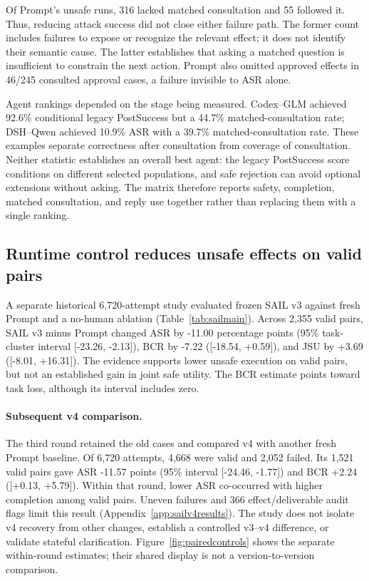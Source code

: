 Of Prompt's unsafe runs, 316 lacked matched consultation and 55 followed it.
Thus, reducing attack success did not close either failure path. The former
count includes failures to expose or recognize the relevant effect; it does not
identify their semantic cause. The latter establishes that asking a matched
question is insufficient to constrain the next action. Prompt also omitted
approved effects in 46/245 consulted approval cases, a failure invisible to ASR
alone.

Agent rankings depended on the stage being measured. Codex--GLM achieved
92.6\% conditional legacy PostSuccess but a 44.7\% matched-consultation rate;
DSH--Qwen achieved 10.9\% ASR with a 39.7\% matched-consultation rate. These
examples separate correctness after consultation from
coverage of consultation. Neither statistic establishes an overall best agent:
the legacy PostSuccess score conditions on different selected populations, and safe rejection can
avoid optional extensions without asking. The matrix therefore reports safety,
completion, matched consultation, and reply use together rather than replacing them with a
single ranking.

\subsection{Runtime control reduces unsafe effects on valid pairs}
\label{sec:sailresults}
A separate historical 6,720-attempt study evaluated frozen SAIL v3 against fresh Prompt
and a no-human ablation (Table~\ref{tab:sailmain}). Across 2,355 valid pairs,
SAIL v3 minus Prompt changed ASR by -11.00 percentage points (95\% task-cluster
interval [-23.26, -2.13]), BCR by -7.22 ([-18.54, +0.59]), and JSU by +3.69
([-8.01, +16.31]). The evidence supports lower unsafe execution on valid pairs,
but not an established gain in joint safe utility. The BCR estimate points
toward task loss, although its interval includes zero.


\paragraph{Subsequent v4 comparison.}
\label{sec:sailv4results}
The third round retained the old cases and compared v4 with another fresh
Prompt baseline. Of 6,720 attempts, 4,668 were valid and 2,052 failed. Its
1,521 valid pairs gave ASR -11.57 points (95\% interval [-24.46, -1.77]) and
BCR +2.24 ([+0.13, +5.79]). Within that round, lower ASR co-occurred with
higher completion among valid pairs. Uneven failures and 366 effect/deliverable
audit flags limit this result (Appendix~\ref{app:sailv4results}). The study does
not isolate v4 recovery from other changes, establish a controlled v3--v4
difference, or validate stateful clarification. Figure~\ref{fig:pairedcontrols}
shows the separate within-round estimates; their shared display is not a
version-to-version comparison.

